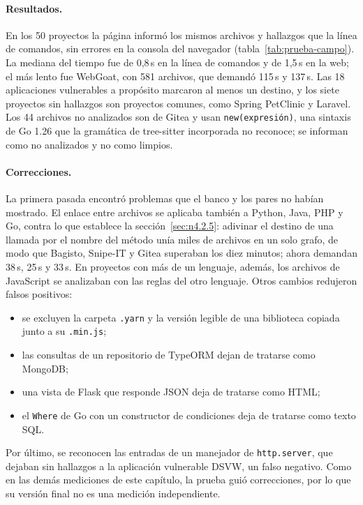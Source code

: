 \paragraph{Resultados.} En los 50 proyectos la página informó los mismos
archivos y hallazgos que la línea de comandos, sin errores en la consola
del navegador (tabla~\ref{tab:prueba-campo}). La mediana del tiempo fue
de 0,8\,s en la línea de comandos y de 1,5\,s en la web; el más lento fue
WebGoat, con 581 archivos, que demandó 115\,s y 137\,s. Las 18
aplicaciones vulnerables a propósito marcaron al menos un destino, y los
siete proyectos sin hallazgos son proyectos comunes, como Spring
PetClinic y Laravel. Los 44 archivos no analizados son de Gitea y usan
\texttt{new(expresión)}, una sintaxis de Go 1.26 que la gramática de
tree-sitter incorporada no reconoce; se informan como no analizados y no
como limpios.

\paragraph{Correcciones.} La primera pasada encontró problemas que el
banco y los pares no habían mostrado. El enlace entre archivos se
aplicaba también a Python, Java, PHP y Go, contra lo que establece la
sección~\ref{sec:n4.2.5}: adivinar el destino de una llamada por el
nombre del método unía miles de archivos en un solo grafo, de modo que
Bagisto, Snipe-IT y Gitea superaban los diez minutos; ahora demandan
38\,s, 25\,s y 33\,s. En proyectos con más de un lenguaje, además, los
archivos de JavaScript se analizaban con las reglas del otro lenguaje.
Otros cambios redujeron falsos positivos:
\begin{itemize}
    \item se excluyen la carpeta \texttt{.yarn} y la versión legible de una
          biblioteca copiada junto a su \texttt{.min.js};
    \item las consultas de un repositorio de TypeORM dejan de tratarse como
          MongoDB;
    \item una vista de Flask que responde JSON deja de tratarse como HTML;
    \item el \texttt{Where} de Go con un constructor de condiciones deja de
          tratarse como texto SQL.
\end{itemize}
Por último, se reconocen las entradas de un manejador de
\texttt{http.server}, que dejaban sin hallazgos a la aplicación
vulnerable DSVW, un falso negativo. Como en las demás mediciones de este
capítulo, la prueba guió correcciones, por lo que su versión final no es
una medición independiente.

